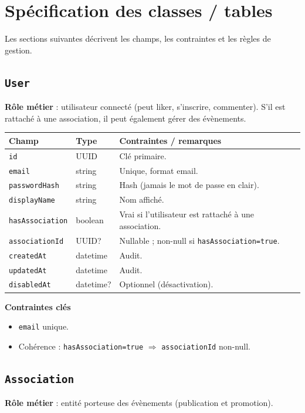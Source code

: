 \documentclass[11pt,a4paper]{article}
\begin{document}
\section{Spécification des classes / tables}
Les sections suivantes décrivent les champs, les contraintes et les règles de gestion.

\subsection{\texttt{User}}
\textbf{Rôle métier} : utilisateur connecté (peut liker, s’inscrire, commenter). S’il est rattaché à une association, il peut également gérer des évènements.

\begin{longtable}{@{}p{}p{}p{}@{}}
\toprule
\textbf{Champ} & \textbf{Type} & \textbf{Contraintes / remarques}\\
\midrule
\endhead
\texttt{id} & UUID & Clé primaire.\\
\texttt{email} & string & Unique, format email.\\
\texttt{passwordHash} & string & Hash (jamais le mot de passe en clair).\\
\texttt{displayName} & string & Nom affiché.\\
\texttt{hasAssociation} & boolean & Vrai si l’utilisateur est rattaché à une association.\\
\texttt{associationId} & UUID? & Nullable ; non-null si \texttt{hasAssociation=true}.\\
\texttt{createdAt} & datetime & Audit.\\
\texttt{updatedAt} & datetime & Audit.\\
\texttt{disabledAt} & datetime? & Optionnel (désactivation).\\
\bottomrule
\end{longtable}

\textbf{Contraintes clés}
\begin{itemize}
  \item \texttt{email} unique.
  \item Cohérence : \texttt{hasAssociation=true} $\Rightarrow$ \texttt{associationId} non-null.
\end{itemize}

\subsection{\texttt{Association}}
\textbf{Rôle métier} : entité porteuse des évènements (publication et promotion).
\end{document}
